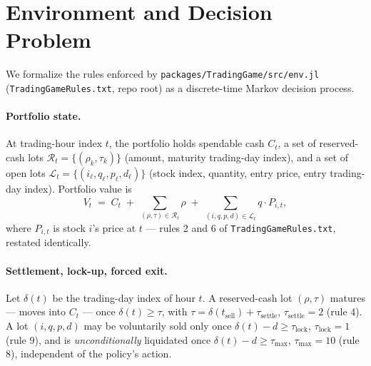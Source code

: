 \documentclass[11pt]{article}
\newcommand{\code}[1]{\texttt{#1}}
\begin{document}
\section{Environment and Decision Problem}
\label{sec:mdp}

We formalize the rules enforced by \code{packages/TradingGame/src/env.jl}
(\texttt{TradingGameRules.txt}, repo root) as a discrete-time Markov decision
process.

\paragraph{Portfolio state.} At trading-hour index $t$, the portfolio holds
spendable cash $C_t$, a set of reserved-cash lots
$\mathcal{R}_t = \{(\rho_k, \tau_k)\}$ (amount, maturity trading-day index),
and a set of open lots $\mathcal{L}_t = \{(i_\ell, q_\ell, p_\ell, d_\ell)\}$
(stock index, quantity, entry price, entry trading-day index). Portfolio
value is
\begin{equation}
  V_t \;=\; C_t \;+\; \sum_{(\rho,\tau)\in\mathcal{R}_t}\rho
       \;+\; \sum_{(i,q,p,d)\in\mathcal{L}_t} q \cdot P_{i,t},
  \label{eq:portfolio-value}
\end{equation}
where $P_{i,t}$ is stock $i$'s price at $t$ --- rules 2 and 6 of
\texttt{TradingGameRules.txt}, restated identically.

\paragraph{Settlement, lock-up, forced exit.} Let $\delta(t)$ be the trading-day
index of hour $t$. A reserved-cash lot $(\rho,\tau)$ matures --- moves into
$C_t$ --- once $\delta(t) \ge \tau$, with $\tau = \delta(t_{\text{sell}}) +
\tau_{\text{settle}}$, $\tau_{\text{settle}}=2$ (rule 4). A lot
$(i,q,p,d)$ may be voluntarily sold only once $\delta(t) - d \ge
\tau_{\text{lock}}$, $\tau_{\text{lock}}=1$ (rule 9), and is
\emph{unconditionally} liquidated once $\delta(t) - d \ge \tau_{\text{max}}$,
$\tau_{\text{max}}=10$ (rule 8), independent of the policy's action.
\end{document}
